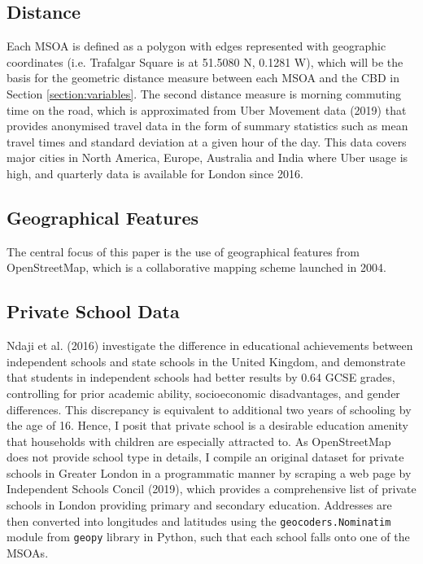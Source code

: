 \documentclass{article}
\begin{document}
\subsection{Distance}
Each MSOA is defined as a polygon with edges represented with geographic coordinates (i.e. Trafalgar Square is at 51.5080 N, 0.1281 W), which will be the basis for the geometric distance measure between each MSOA and the CBD in Section \ref{section:variables}. The second distance measure is morning commuting time on the road, which is approximated from Uber Movement data (2019) that provides anonymised travel data in the form of summary statistics such as mean travel times and standard deviation at a given hour of the day. This data covers major cities in North America, Europe, Australia and India where Uber usage is high, and quarterly data is available for London since 2016.

\subsection{Geographical Features}
The central focus of this paper is the use of geographical features from OpenStreetMap, which is a collaborative mapping scheme launched in 2004.


\subsection{Private School Data} \label{subsection:school}
Ndaji et al. (2016) investigate the difference in educational achievements between independent schools and state schools in the United Kingdom, and demonstrate that students in independent schools had better results by 0.64 GCSE grades, controlling for prior academic ability, socioeconomic disadvantages, and gender differences. This discrepancy is equivalent to additional two years of schooling by the age of 16. Hence, I posit that private school is a desirable education amenity that households with children are especially attracted to. As OpenStreetMap does not provide school type in details, I compile an original dataset for private schools in Greater London in a programmatic manner by scraping a web page by Independent Schools Concil (2019), which provides a comprehensive list of private schools in London providing primary and secondary education. Addresses are then converted into longitudes and latitudes using the \texttt{geocoders.Nominatim} module from \texttt{geopy} library in Python, such that each school falls onto one of the MSOAs.
\end{document}
